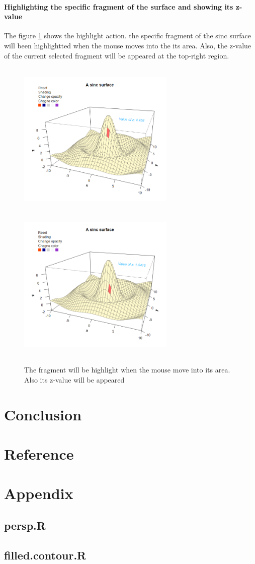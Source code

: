 \documentclass[paper=a4, fontsize=11pt]{report}
\begin{document}
\subsubsection*{Highlighting the specific fragment of the surface and showing its z-value}
The figure \ref{Example_6.3.4} shows the highlight action. the specific fragment of the sinc surface will been highlightted when the mouse moves into the its area. Also, the z-value of the current selected fragment will be appeared at the top-right region. 
\begin{figure}[h]
\begin{center}
  \includegraphics[height = 7.5cm, width = 7.5cm]{figure/svg/hlight_1.PNG}
  \includegraphics[height = 7.5cm, width = 7.5cm]{figure/svg/hlight_2.PNG}
  \caption{The fragment will be highlight when the mouse move into its area. Also its z-value will be appeared}
  	\label{Example_6.3.4}
\end{center}
\end{figure}

\chapter{Conclusion}
\chapter{Reference}
\chapter{Appendix}
\section{persp.R}
\section{filled.contour.R}
\end{document}

